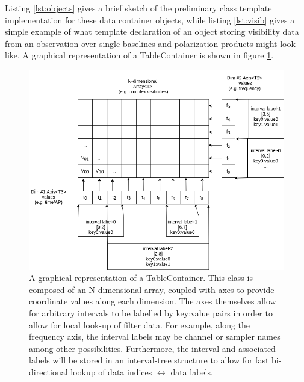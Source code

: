 \documentclass[hidelinks]{article}
\begin{document}
Listing \ref{lst:objects} gives a brief sketch of the preliminary class template implementation for these data container objects, while listing \ref{lst:visib} gives a simple example of what template declaration of an object storing visibility data from an observation over single baselines and polarization products might look like.
A graphical representation of a TableContainer is shown in figure \ref{fig:table-container}.






\begin{figure}[h!]
\begin{center}
  \includegraphics[width=\textwidth]{data-container-baseline.png}
    \caption{A graphical representation of a TableContainer. This class is composed of an N-dimensional array, coupled with axes to provide coordinate values
    along each dimension. The axes themselves allow for arbitrary intervals to be labelled by key:value pairs in order to allow for local look-up of filter data.
    For example, along the frequency axis, the interval labels may be channel or sampler names among other possibilities. Furthermore, the interval and associated
    labels will be stored in an interval-tree structure to allow for fast bi-directional lookup of data indices $\leftrightarrow$ data labels.}
    \label{fig:table-container}
\end{center}
\end{figure}
\end{document}
